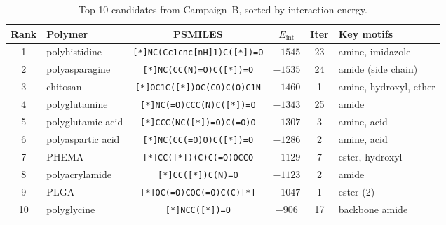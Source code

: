 \documentclass[twocolumn]{fairmeta}
\begin{document}
\begin{table}[t]
\centering
\caption{Top 10 candidates from Campaign~B, sorted by interaction energy.}
\label{tab:agentic_top_b}
\small
\begin{tabular}{clcccl}
\toprule
\textbf{Rank} & \textbf{Polymer} & \textbf{PSMILES} & \textbf{$E_\text{int}$} & \textbf{Iter} & \textbf{Key motifs} \\
\midrule
1  & polyhistidine & \texttt{\footnotesize [*]NC(Cc1cnc[nH]1)C([*])=O} & $-1545$ & 23 & amine, imidazole \\
2  & polyasparagine & \texttt{\footnotesize [*]NC(CC(N)=O)C([*])=O} & $-1535$ & 24 & amide (side chain) \\
3  & chitosan & \texttt{\footnotesize [*]OC1C([*])OC(CO)C(O)C1N} & $-1460$ & 1  & amine, hydroxyl, ether \\
4  & polyglutamine & \texttt{\footnotesize [*]NC(=O)CCC(N)C([*])=O} & $-1343$ & 25 & amide \\
5  & polyglutamic acid & \texttt{\footnotesize [*]CCC(NC([*])=O)C(=O)O} & $-1307$ & 3  & amine, acid \\
6  & polyaspartic acid & \texttt{\footnotesize [*]NC(CC(=O)O)C([*])=O} & $-1286$ & 2  & amine, acid \\
7  & PHEMA & \texttt{\footnotesize [*]CC([*])(C)C(=O)OCCO} & $-1129$ & 7  & ester, hydroxyl \\
8  & polyacrylamide & \texttt{\footnotesize [*]CC([*])C(N)=O} & $-1123$ & 2  & amide \\
9  & PLGA & \texttt{\footnotesize [*]OC(=O)COC(=O)C(C)[*]} & $-1047$ & 1  & ester (2) \\
10 & polyglycine & \texttt{\footnotesize [*]NCC([*])=O} & $-906$ & 17 & backbone amide \\
\bottomrule
\end{tabular}
\end{table}
\end{document}
